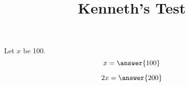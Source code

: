 \documentclass{ximera}
\title{Kenneth's Test}
\begin{document}
\maketitle
\begin{exercise}
Let $x$ be 100.
\[ x = \answer{100}\]
\begin{exercise}
\[ 2x = \answer{200}\]
\end{exercise}
\end{exercise}
\end{document}
